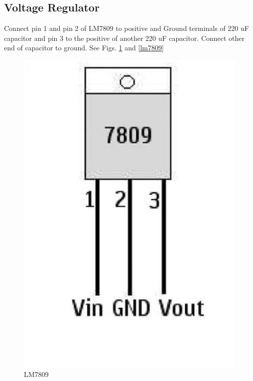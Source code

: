 \documentclass[journal,12pt,twocolumn]{IEEEtran}
\begin{document}
\subsection{Voltage Regulator}

\begin{problem}
Connect pin 1 and pin 2 of LM7809 to positive and Ground terminals of 220 uF capacitor and pin 3 to 
the positive of another 220 uF capacitor. Connect other end of capacitor to ground. 
See Figs. \ref{fig4} and \ref{lm7809}
\end{problem} 
\begin{figure}[!ht]
\centering
	\includegraphics[width=\columnwidth]{./figs/ic.eps}
	\caption{LM7809}  \label{fig4}
    \end{figure}
\end{document}
